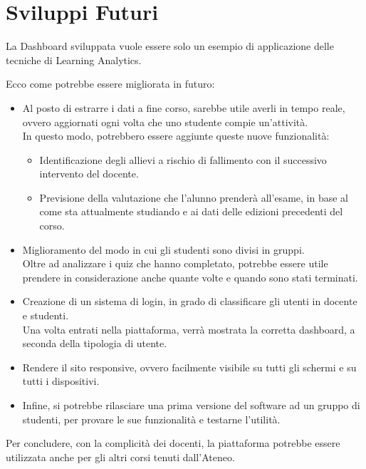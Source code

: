 \chapter{Sviluppi Futuri}

La Dashboard sviluppata vuole essere solo un esempio di applicazione delle tecniche di Learning Analytics. 

Ecco come potrebbe essere migliorata in futuro:
\begin{itemize}
\item Al posto di estrarre i dati a fine corso, sarebbe utile averli in tempo reale, ovvero aggiornati ogni volta che uno studente compie un'attività. \\ In questo modo, potrebbero essere aggiunte queste nuove funzionalità:
\begin{itemize}
\item Identificazione degli allievi a rischio di fallimento con il successivo intervento del docente.
\item Previsione della valutazione che l'alunno prenderà all’esame, in base al come sta attualmente studiando e ai dati delle edizioni precedenti del corso. 
\end{itemize}
\item Miglioramento del modo in cui gli studenti sono divisi in gruppi. \\ Oltre ad analizzare i quiz che hanno completato, potrebbe essere utile prendere in considerazione anche quante volte e quando sono stati terminati. 
\item Creazione di un sistema di login, in grado di classificare gli utenti in docente e studenti. \\ Una volta entrati nella piattaforma, verrà mostrata la corretta dashboard, a seconda della tipologia di utente.
\item Rendere il sito responsive, ovvero facilmente visibile su tutti gli schermi e su tutti i dispositivi.
\item Infine, si potrebbe rilasciare una prima versione del software ad un gruppo di studenti, per provare le sue funzionalità e testarne l'utilità.
\end{itemize}

Per concludere, con la complicità dei docenti, la piattaforma potrebbe essere utilizzata anche per gli altri corsi tenuti dall'Ateneo.